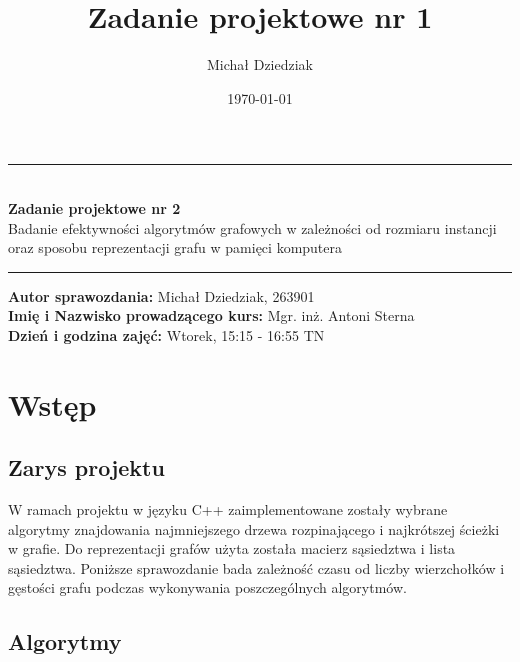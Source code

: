 \documentclass{article}
\title{Zadanie projektowe nr 1}
\author{Michał Dziedziak}
\date{\today}
\begin{document}
\begin{titlepage}
    \begin{center}
        \vspace*{5cm}
        \rule{500pt}{1pt}\\
        \vspace*{0.5cm}
        \LARGE
        \textbf{Zadanie projektowe nr 2}\\
        \Large
        Badanie efektywności algorytmów grafowych w zależności od rozmiaru instancji
        oraz sposobu reprezentacji grafu w pamięci komputera \\
        \vspace*{0.5cm}
        \rule{500pt}{1pt}
    \end{center}

    \vspace*{12cm}

    {\raggedright
        \large
        \textbf{Autor sprawozdania:} Michał Dziedziak,  263901\\
        \textbf{Imię i Nazwisko prowadzącego kurs:} Mgr. inż. Antoni Sterna\\
        \textbf{Dzień i godzina zajęć:} Wtorek, 15:15 - 16:55 TN
    }
\end{titlepage}


\tableofcontents
\listoftables
\listoffigures


\newpage

\section{Wstęp}
    \subsection{Zarys projektu}
    W ramach projektu w języku C++ zaimplementowane zostały wybrane algorytmy znajdowania najmniejszego
    drzewa rozpinającego i najkrótszej ścieżki w grafie. Do reprezentacji grafów użyta została macierz sąsiedztwa i lista sąsiedztwa. 
    Poniższe sprawozdanie bada zależność czasu od liczby wierzchołków i gęstości grafu podczas wykonywania poszczególnych algorytmów.

    \subsection{Algorytmy}
\end{document}
